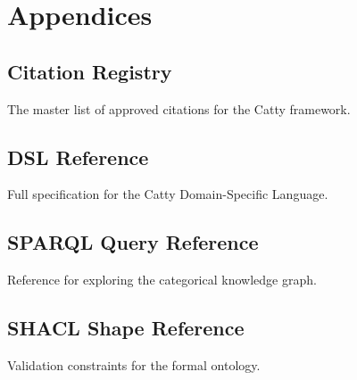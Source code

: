 
\chapter*{Appendices}

\section*{Citation Registry}
The master list of approved citations for the Catty framework.

\section*{DSL Reference}
Full specification for the Catty Domain-Specific Language.

\section*{SPARQL Query Reference}
Reference for exploring the categorical knowledge graph.

\section*{SHACL Shape Reference}
Validation constraints for the formal ontology.
